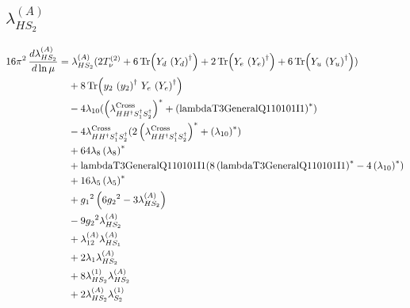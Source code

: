 \documentclass[10pt,a4paper]{article}
\begin{document}
\subsection*{$\lambda_{HS_2}^{(A)}$}
\begin{align*}
16\pi^2\,\frac{d \lambda_{HS_2}^{(A)}}{d\ln\mu} &={\lambda_{HS_2}^{(A)}} (2 T_{\nu}^{(2)}+6 \operatorname{Tr}\!\left({Y_d}\,\left({Y_d}\right)^{\dagger}\right)+2 \operatorname{Tr}\!\left({Y_e}\,\left({Y_e}\right)^{\dagger}\right)+6 \operatorname{Tr}\!\left({Y_u}\,\left({Y_u}\right)^{\dagger}\right)) \\
&\quad +8 \operatorname{Tr}\!\left({y_2}\,\left({y_2}\right)^{\dagger}\,{Y_e}\,\left({Y_e}\right)^{\dagger}\right) \\
&\quad -4 {\lambda_{10}} (\left({\lambda_{H H^\dagger S_1^\dagger S_2^\dagger}^{\rm Cross}}\right)^{*}+\left(\text{lambdaT3GeneralQ110101I1}\right)^{*}) \\
&\quad -4 {\lambda_{H H^\dagger S_1^\dagger S_2^\dagger}^{\rm Cross}} (2 \left({\lambda_{H H^\dagger S_1^\dagger S_2^\dagger}^{\rm Cross}}\right)^{*}+\left({\lambda_{10}}\right)^{*}) \\
&\quad +64 {\lambda_{8}} \left({\lambda_{8}}\right)^{*} \\
&\quad +\text{lambdaT3GeneralQ110101I1} (8 \left(\text{lambdaT3GeneralQ110101I1}\right)^{*}-4 \left({\lambda_{10}}\right)^{*}) \\
&\quad +16 {\lambda_5} \left({\lambda_5}\right)^{*} \\
&\quad +{g_1}^2 \left(6 {g_2}^2-3 {\lambda_{HS_2}^{(A)}}\right) \\
&\quad -9 {g_2}^2 {\lambda_{HS_2}^{(A)}} \\
&\quad +{\lambda_{12}^{(A)}} {\lambda_{HS_1}^{(A)}} \\
&\quad +2 {\lambda_1} {\lambda_{HS_2}^{(A)}} \\
&\quad +8 {\lambda_{HS_2}^{(1)}} {\lambda_{HS_2}^{(A)}} \\
&\quad +2 {\lambda_{HS_2}^{(A)}} {\lambda_{S_2}^{(1)}} \\
\end{align*}
\end{document}
